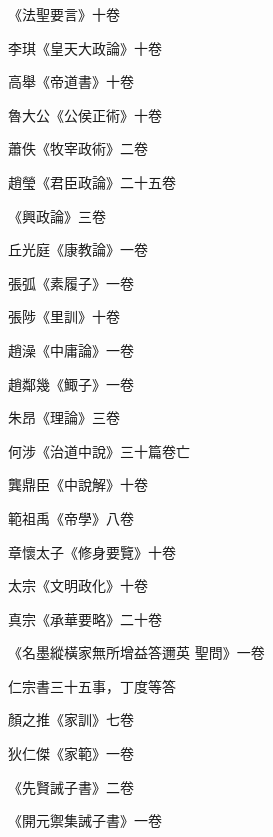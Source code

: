 \begin{pinyinscope}
 《法聖要言》十卷



 李琪《皇天大政論》十卷



 高舉《帝道書》十卷



 魯大公《公侯正術》十卷



 蕭佚《牧宰政術》二卷



 趙瑩《君臣政論》二十五卷



 《興政論》三卷



 丘光庭《康教論》一卷



 張弧《素履子》一卷



 張陟《里訓》十卷



 趙澡《中庸論》一卷



 趙鄰幾《鯫子》一卷



 朱昂《理論》三卷



 何涉《治道中說》三十篇卷亡



 龔鼎臣《中說解》十卷



 範祖禹《帝學》八卷



 章懷太子《修身要覽》十卷



 太宗《文明政化》十卷



 真宗《承華要略》二十卷



 《名墨縱橫家無所增益答邇英
 聖問》一卷



 仁宗書三十五事，丁度等答



 顏之推《家訓》七卷



 狄仁傑《家範》一卷



 《先賢誡子書》二卷



 《開元禦集誡子書》一卷




\end{pinyinscope}
